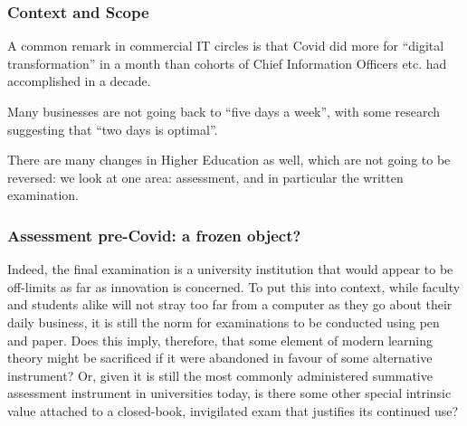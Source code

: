 \frame{
\titlepage
}
\begin{frame}[fragile]
\frametitle{Context and Scope}
\pause
A common remark in commercial IT circles is that Covid did more for ``digital transformation'' in a month than cohorts of Chief  Information Officers etc. had accomplished in a decade. 
\pause\par
 Many businesses are not going back to ``five days a week'', with some research \cite{Bindley2022a} suggesting that ``two days is optimal''.
\par\pause
There are many changes in Higher Education as well, which are not going to be reversed: we look at one area: assessment, and in particular the written examination.
\end{frame}
\begin{frame}[fragile]
\frametitle{Assessment pre-Covid: a frozen object?}
\pause
Indeed, the final examination is a university institution that would appear to be off-limits as far as innovation is concerned. To put this into context, while faculty and students alike will not stray too far from a computer as they go about their daily business, it is still the norm for examinations to be conducted using pen and paper. Does this imply, therefore, that some element of modern learning theory might be sacrificed if it were abandoned in favour of some alternative instrument? Or, given it is still the most commonly administered summative assessment instrument in universities today, is there some other special intrinsic value attached to a closed-book, invigilated exam that justifies its continued use?
\cite{WilliamsWong2009a}
\end{frame}
